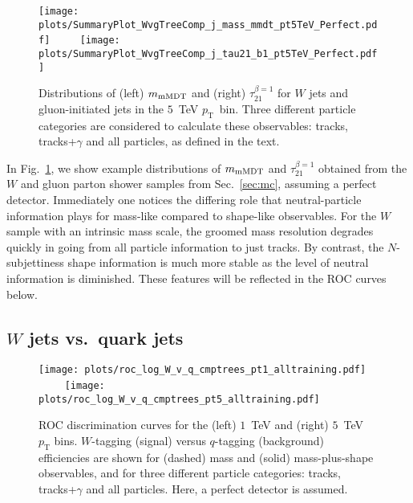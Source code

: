 \documentclass[11pt,letterpaper]{article}
\DeclareRobustCommand{\Sec}[1]{Sec.~\ref{#1}}
\DeclareRobustCommand{\Fig}[1]{Fig.~\ref{#1}}
\newcommand{\pt}{p_{\mathrm{T}}}
\begin{document}
 
\begin{figure}[t]
\begin{center}
\texttt{[image: plots/SummaryPlot\_WvgTreeComp\_j\_mass\_mmdt\_pt5TeV\_Perfect.pdf]}
$\qquad$
\texttt{[image: plots/SummaryPlot\_WvgTreeComp\_j\_tau21\_b1\_pt5TeV\_Perfect.pdf]}\\[-0.6em]
\end{center}
\caption{Distributions of (left) ${m}_{\rm mMDT}$ and (right) $\tau^{\beta = 1}_{21}$ for $W$ jets and gluon-initiated jets in the $5$~TeV $\pt$~bin.  Three different particle categories are considered to calculate these observables:  tracks, tracks+$\gamma$ and all particles, as defined in the text. }
\label{fig:SummaryPlots_Wvq_InfoComparison}
\end{figure}


In \Fig{fig:SummaryPlots_Wvq_InfoComparison}, we show example distributions of $m_{\rm mMDT}$ and $\tau_{21}^{\beta=1}$ obtained from the $W$ and gluon parton shower samples from \Sec{sec:mc}, assuming a perfect detector.
%
Immediately one notices the differing role that neutral-particle information plays for mass-like compared to shape-like observables.
%
For the $W$ sample with an intrinsic mass scale, the groomed mass resolution degrades quickly in going from all particle information to just tracks.
%
By contrast, the $N$-subjettiness shape information is much more stable as the level of neutral information is diminished.
%
These features will be reflected in the ROC curves below.



\subsection{\texorpdfstring{$W$}{W} jets vs.\ quark jets}

\begin{figure}[p]
\begin{center}
\texttt{[image: plots/roc\_log\_W\_v\_q\_cmptrees\_pt1\_alltraining.pdf]}
$\qquad$
\texttt{[image: plots/roc\_log\_W\_v\_q\_cmptrees\_pt5\_alltraining.pdf]}
\end{center}
\caption{ROC discrimination curves for the (left) $1$~TeV and (right) $5$~TeV~$\pt$ bins. $W$-tagging (signal) versus $q$-tagging (background) efficiencies are shown for (dashed) mass and (solid) mass-plus-shape observables, and for three different particle categories: tracks, tracks+$\gamma$ and all particles.  Here, a perfect detector is assumed.}
\label{fig:ROC_Wq_F1}
\end{figure}
\end{document}
